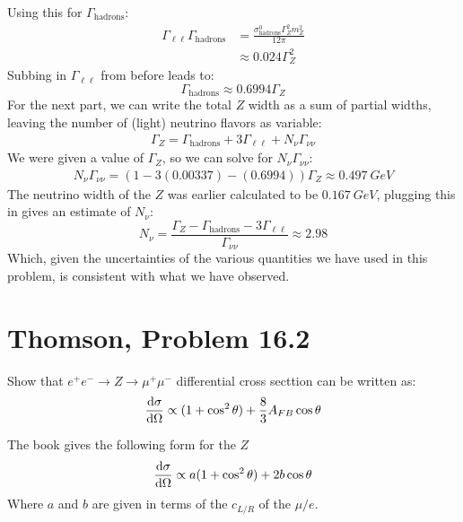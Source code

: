 \documentclass[12pt]{article}
\renewcommand{\l}{\ell}
\begin{document}
Using this for $\Gamma_{\text{hadrons}}$:
\begin{align*}
  \Gamma_{\l\l}\Gamma_{\text{hadrons}}&=
  \frac{\sigma^0_{\text{hadrons}}\Gamma_Z^2m_Z^2}{12\pi}\\
  &\approx0.024\Gamma_Z^2
\end{align*}
Subbing in $\Gamma_{\l\l}$ from before leads to:
\begin{equation}
  \label{eq:p3b}
  \boxed{\Gamma_{\text{hadrons}}\approx0.6994\Gamma_Z}
\end{equation}
For the next part, we can write the total $Z$ width as a sum of partial widths, leaving the number of (light) neutrino flavors as variable:
\begin{align*}
  \Gamma_Z=\Gamma_{\text{hadrons}}+3\Gamma_{\l\l}+N_\nu\Gamma_{\nu\nu}
\end{align*}
We were given a value of $\Gamma_Z$, so we can solve for $N_\nu\Gamma_{\nu\nu}$:
\begin{align*}
  N_\nu\Gamma_{\nu\nu}=(1-3(0.00337)-(0.6994))\Gamma_Z\approx\SI{0.497}{GeV}
\end{align*}
The neutrino width of the $Z$ was earlier calculated to be $\SI{0.167}{GeV}$, plugging this in gives an estimate of $N_\nu$:
\begin{equation}
  \label{eq:p3c}
  \boxed{N_\nu=\frac{\Gamma_Z-\Gamma_{\text{hadrons}}-3\Gamma_{\l\l}}{\Gamma_{\nu\nu}}\approx2.98}
\end{equation}
Which, given the uncertainties of the various quantities we have used in this problem, is consistent with what we have observed.
\newpage
\section{Thomson, Problem 16.2}
\begin{problem}
  Show that $e^+e^-\to Z\to \mu^+\mu^-$ differential cross secttion can be written as:
  \begin{align*}
    \dv{\sigma}{\Omega}\propto(1+\cos^2\theta)+\frac83A_{FB}\cos\theta
  \end{align*}
\end{problem}
The book gives the following form for the $Z$
\begin{align*}
  \dv{\sigma}{\Omega}\propto a(1+\cos^2\theta)+2b\cos\theta
\end{align*}
Where $a$ and $b$ are given in terms of the $c_{L/R}$ of the $\mu/e$.
\end{document}

